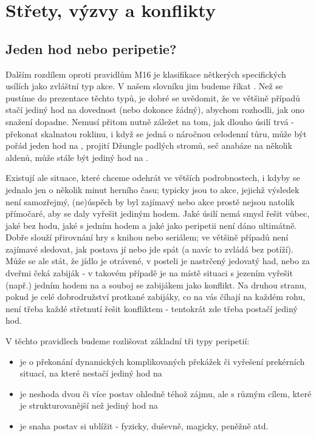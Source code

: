 \documentclass[../main.tex]{subfiles}
\begin{document}
\chapter{Střety, výzvy a konflikty}
\label{chap:jdesenavec}

\section{Jeden hod nebo peripetie?}
\label{sec:hod/peripetie}

Dalším rozdílem oproti pravidlům M16 je klasifikace nětkerých specifických usílích jako zvláštní typ akce. V našem slovníku jim budeme říkat . Než se pustíme do prezentace těchto typů, je dobré se uvědomit, že ve většině případů stačí jediný hod na dovednost (nebo dokonce žádný), abychom rozhodli, jak ono snažení dopadne. Nemusí přitom nutně záležet na tom, jak dlouho úsilí trvá - překonat skalnatou roklinu, i když se jedná o náročnou celodenní tůru, může být pořád jeden hod na , projití Džungle padlých stromů, seč anabáze na několik aldenů, může stále být jediný hod na .

Existují ale situace, které chceme odehrát ve větších podrobnostech, i kdyby se jednalo jen o několik minut herního času; typicky jsou to akce, jejichž výsledek není samozřejmý, (ne)úspěch by byl zajímavý nebo akce prostě nejsou natolik přímočaré, aby se daly vyřešit jediným hodem. Jaké úsilí nemá smysl řešit vůbec, jaké bez hodu, jaké s jedním hodem a jaké jako peripetii není dáno ultimátně. Dobře slouží přirovnání hry s knihou nebo seriálem; ve většině případů není zajímavé sledovat, jak postava jí nebo jde spát (a navíc to zvládá bez potíží). Může se ale stát, že jídlo je otrávené, v posteli je nastrčený jedovatý had, nebo za dveřmi čeká zabiják - v takovém případě je na místě situaci s jezením vyřešit (např.) jedním hodem na  a souboj se zabijákem jako konflikt. Na druhou stranu, pokud je celé dobrodružství protkané zabijáky, co na vás číhají na každém rohu, není třeba každé střetnutí řešit konfliktem - tentokrát zde třeba postačí jediný hod.

V těchto pravidlech budeme rozlišovat základní tři typy peripetií:

\begin{itemize}
\item {} je o překonání dynamických komplikovaných překážek či vyřešení prekérních situací, na které nestačí jediný hod na 
\item {} je neshoda dvou či více postav ohledně téhož zájmu, ale s různým cílem, které je strukturovanější než jediný hod na 
\item {} je snaha postav si ublížit - fyzicky, duševně, magicky, peněžně atd.
\end{itemize}
\end{document}
